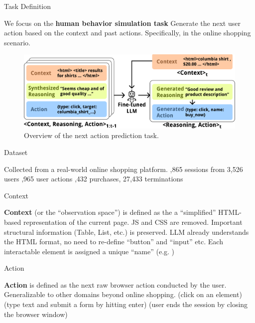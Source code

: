 \documentclass[scheme=plain]{beamer}
\begin{document}
\begin{frame}{Task Definition}
  \begin{outline}
    \1 We focus on the \textbf{human behavior simulation task}
      \2 Generate the next user action based on the context and past actions.
      \2 Specifically, in the online shopping scenario.
  \end{outline}
  \begin{figure}
    \includegraphics[width=\linewidth]{figures/teaser.pdf}
    \caption{Overview of the next action prediction task.}
  \end{figure}
\end{frame}

\begin{frame}{Dataset}
  \begin{outline}
    \1 Collected from a real-world online shopping platform.
    ,865 sessions from 3,526 users
    ,965 user actions
    ,432 purchases, 27,433 terminations
  \end{outline}
\end{frame}

\begin{frame}{Context}
  \begin{outline}
    \1 \textbf{Context} (or the ``observation space'') is defined as the a ``simplified'' HTML-based representation of the current page.
    \1 JS and CSS are removed.
    \1 Important structural information (Table, List, etc.) is preserved.
    \1 LLM already understands the HTML format, no need to re-define ``button'' and ``input'' etc.
    \pause
    \1 Each interactable element is assigned a unique ``name'' (e.g. )
  \end{outline}
\end{frame}
\begin{frame}{Action}
  \begin{outline}
    \1 \textbf{Action} is defined as the next raw browser action conducted by the user.
      \2 Generalizable to other domains beyond online shopping.
    \1  (click on an element)
    \1  (type text and submit a form by hitting enter)
    \1  (user ends the session by closing the browser window)
  \end{outline}
\end{frame}
\end{document}
